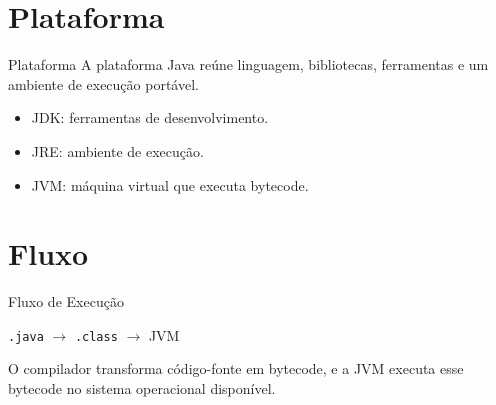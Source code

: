 


\startLectureFile

\section{Plataforma}

\begin{frame}{Plataforma}
A plataforma Java reúne linguagem, bibliotecas, ferramentas e um ambiente de execução portável.


\begin{itemize}
  \item JDK: ferramentas de desenvolvimento.
  \item JRE: ambiente de execução.
  \item JVM: máquina virtual que executa bytecode.
\end{itemize}
\end{frame}

\section{Fluxo}

\begin{frame}{Fluxo de Execução}
\begin{center}
\Large
\texttt{.java} $\rightarrow$ \texttt{.class} $\rightarrow$ JVM
\end{center}

O compilador transforma código-fonte em bytecode, e a JVM executa esse bytecode no sistema operacional disponível.
\end{frame}

\finishLectureFile
